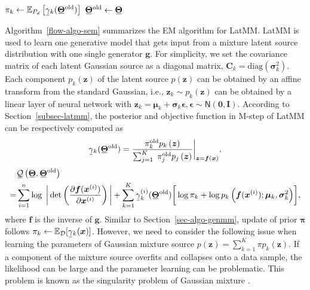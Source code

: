 \begin{algorithm}[t]
\begin{algorithmic}[1]
    \STATE $\pi_k \gets \EE_{P_d}\left[ \ubar{\gamma}_k(\ubar{\bm{\Theta}}^{\mathrm{old}}) \right]$%
    \STATE $\ubar{\bm{\Theta}}^{\mathrm{old}} \gets \ubar{\bm{\Theta}}$
    \ENDIF
    \ENDFOR
  \end{algorithmic}
\end{algorithm}


Algorithm~\ref{flow-algo-sem} summarizes the EM algorithm for LatMM.
LatMM is used to
learn one generative model that gets input from a mixture latent source
distribution with one single generator $\bm{g}$. For simplicity, we set
the covariance matrix of each latent Gaussian source as a diagonal
matrix, $\bm{C}_k = \mathrm{diag}(\bm{\sigma}_k^2) $. Each component $p_k(\bm{z})$ of
the latent source $p(\bm{z})$ can be obtained by an affine transform from
the standard Gaussian, {i.e.}, $\bm{z}_k \sim p_k(\bm{z})$ can be
obtained by a linear layer of neural network with $\bm{z}_k = \bm{\mu}_k
+ \bm{\sigma}_k \bm{\epsilon}, \bm{\epsilon} \sim \mathsf{N}(\bm{0}, \bm{I})$.
According to Section~\ref{subsec-latmm}, the posterior and objective function in M-step of LatMM can be respectively computed as
\begin{align}\label{em-latmm-gamma}
  \ubar{\gamma}_k(\ubar{\bm{\Theta}}^{\mathrm{old}}) = \frac{\pi_k^{\mathrm{old}} p_k\left(\bm{z}\right)}{\sum_{j=1}^K\;\pi_j^{\mathrm{old}} p_j\left(\bm{z}\right)}\bigg|_{\bm{z}=\bm{f}(\bm{x})},
\end{align}
\begin{align}\label{eq-latmm-obj}
  &\ubar{\Qq}\left( \ubar{\bm{\Theta}},\ubar{\bm{\Theta}}^{\mathrm{old}}\right) \nonumber \\
    =&\sum_{i=1}^n \log\;\bigg|\det\left(
    \pd{\bm{f}(\bm{x}^{(i)})}{\bm{x}^{(i)}} \right)\bigg| 
  + \sum_{k=1}^{K}\ubar{\gamma}_k^{(i)}(\ubar{\bm{\Theta}}^{\mathrm{old}})\bigg[ \log{\pi_k}
    +\log{p_k\left(\bm{f}(\bm{x}^{(i)}); \bm{\mu}_k, \bm{\sigma}_k^2\right)}\bigg], 
\end{align}
where $\bm{f}$ is the inverse of $\bm{g}$.
Similar to Section~\ref{sec-algo-genmm}, update of prior $\bm{\pi}$
follows $\pi_k \leftarrow \EE_{\Dd}[ \ubar{\gamma}_k(\bm{x})
]$. However, we need to consider the following issue when learning the parameters of
Gaussian mixture source $p(\bm{z}) = \sum_{k=1}^K \pi p_k(\bm{z})$. If a component of the mixture source overfits and collapses onto a data sample, the likelihood can be large and the parameter learning can be problematic. This problem is known as the singularity problem of Gaussian mixture \cite{Bishop:2006:PRM:1162264}.
